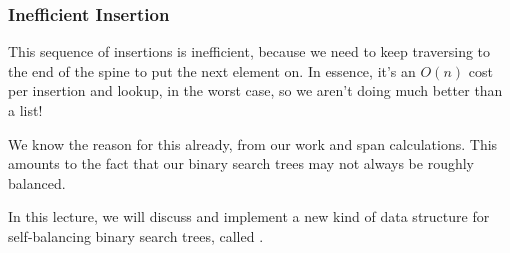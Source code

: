 \documentclass[aspectratio=169]{beamer}
\begin{document}
\begin{frame}[fragile]
\begin{center}
  \begin{minipage}{0.15\textwidth}
    \begin{center}
    \end{center}
  \end{minipage}
  \end{center}
\end{frame}

\begin{frame}[fragile]
  \frametitle{Inefficient Insertion}

  This sequence of insertions is inefficient, because we need to keep traversing
  to the end of the spine to put the next element on. In essence, it's an
  $O(n)$ cost per insertion and lookup, in the worst case, so we aren't doing
  much better than a list!

  \pause
  \vspace{\fill}

  We know the reason for this already, from our work and span calculations. This
  amounts to the fact that our binary search trees may not always be roughly
  balanced.

  \pause
  \vspace{\fill}

  In this lecture, we will discuss and implement a new kind of data structure
  for self-balancing binary search trees, called .
\end{frame}
\end{document}
